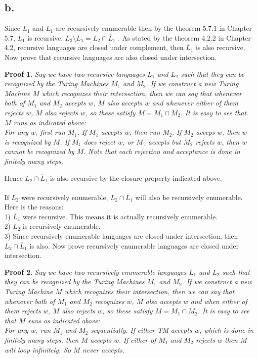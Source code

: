 \documentclass[12pt]{article}
\newtheorem{thm}{Proof}
\begin{document}
\subsection*{b.}

Since $L_1$ and $\overline L_1$ are recursively enumerable then by the theorem 5.7.1 
in Chapter 5.7, $L_1$ is recursive. $L_2 \setminus L_1 = L_2 \cap \overline L_1$
. As stated by the theorem 4.2.2 in Chapter 4.2, recursive languages are closed under 
complement, then $\overline L_1$ is also recursive. Now prove that recursive languages 
are also closed under intersection.

    \begin{thm}
    Say we have two recursive languages $L_1$ and $L_2$ such that they can be recognized
 by the Turing Machines $M_1$ and $M_2$. If we construct a new Turing Machine $M$ which
 recognizes their intersection, then we can say that whenever both of $M_1$ and $M_2$
 accepts $w$, $M$ also accepts $w$ and whenever either of them rejects $w$, $M$ also 
rejects $w$, so these satisfy $M = M_1 \cap M_2$. It is easy to see that $M$ runs as 
indicated above:\\
    For any $w$, first run $M_1$. If $M_1$ accepts $w$, then run $M_2$. If $M_2$ acceps 
$w$, then $w$ is recognized by $M$. If $M_1$ does reject $w$, or $M_1$ accepts but $M_2$ 
rejects $w$, then $w$ cannot be recognized by $M$. Note that each rejection and
acceptance is done in finitely many steps.
    \end{thm}

Hence $L_2 \cap \overline L_1$ is also recursive by the closure property indicated above.
\\ \\

If $L_2$ were recursively enumerable, $L_2 \cap \overline L_1$ will also be recursively
 enumerable. Here is the reasons:\\
1) $\overline L_1$ were recursive. This means it is actually recursively enumerable.\\
2) $L_2$ is recursively enumerable.\\
3) Since recursively enumerable languages are closed under intersection, then $L_2 \cap
 \overline L_1$ is also. Now prove recursively enumerable languages are closed under
 intersection.

    \begin{thm}
    Say we have two recursively enumerable languages $L_1$ and $L_2$ such that they can 
be recognized by the Turing Machines $M_1$ and $M_2$. If we construct a new Turing
 Machine $M$ which recognizes their intersection, then we can say that whenever both of 
$M_1$ and $M_2$ recognizes $w$, $M$ also accepts $w$ and when either of them rejects 
$w$, $M$ also rejects $w$, so these satisfy $M = M_1 \cap M_2$. It is easy to see that 
$M$ runs as indicated above:\\
    For any $w$, run $M_1$ and $M_2$ sequentially. If either TM accepts $w$, which is 
done in finitely many steps, then $M$ accepts $w$. If either of $M_1$ and $M_2$ rejects 
$w$ then $M$ will loop infinitely. So $M$ never accepts.
    \end{thm}
\end{document}
